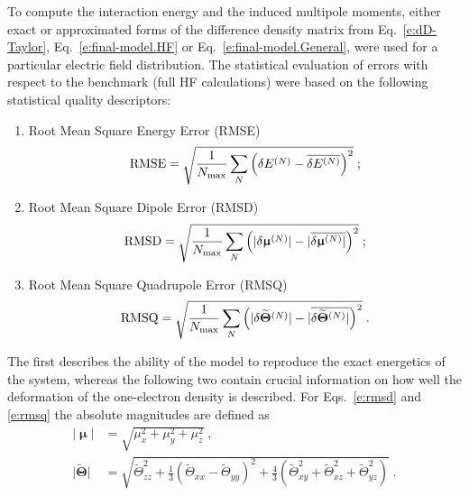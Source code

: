 \documentclass[aip,amsmath,amssymb,reprint,floatfix]{revtex4-1}
\newcommand{\BM}[1]{\bm{#1}}
\begin{document}
To compute the interaction energy and the induced multipole moments, either exact or approximated forms
of the difference density matrix from Eq.~\eqref{e:dD-Taylor}, Eq.~\eqref{e:final-model.HF} or Eq.~\eqref{e:final-model.General},
were used for a particular electric field distribution. The statistical evaluation of
errors with respect to the benchmark (full HF calculations) were based on 
the following statistical quality descriptors:
%
\begin{enumerate}
 \item Root Mean Square Energy Error (RMSE)
   \begin{equation}\label{e:rmse}
     {\rm RMSE} = \sqrt{ \frac{1}{N_{\rm max}} \sum_N \left( \delta E^{(N)} - \overline{\delta E^{(N)}}\right)^2 } \;;
   \end{equation}
 \item Root Mean Square Dipole Error (RMSD)
   \begin{equation}\label{e:rmsd}
     {\rm RMSD} = \sqrt{ \frac{1}{N_{\rm max}}\sum_N \left( \lvert \delta {\BM\upmu}^{(N)} \rvert 
                                             - \lvert \overline{\delta {\BM\upmu}^{(N)} \rvert }\right)^2 } \;;
   \end{equation}
 \item Root Mean Square Quadrupole Error (RMSQ)
   \begin{equation}\label{e:rmsq}
     {\rm RMSQ} = \sqrt{ \frac{1}{N_{\rm max}}\sum_N \left( \lvert \delta \widetilde{\BM\Theta}^{(N)} \rvert 
                                             - \lvert \overline{\delta \widetilde{\BM\Theta}^{(N)} \rvert }\right)^2 } \;.
   \end{equation}
\end{enumerate}
%
The first describes the ability of the model to reproduce the exact energetics of the system, 
whereas the following two contain crucial information on how well the deformation of the one\hyp{}electron
density is described. For Eqs.~\eqref{e:rmsd} and \eqref{e:rmsq} the absolute magnitudes
are defined as
%
\begin{subequations}\label{e:absmagn}
  \begin{align}
   \lvert {\BM\upmu} \rvert &= \sqrt{\mu_x^2+\mu_y^2+\mu_z^2} \;,\\
   \lvert {\widetilde{\BM\Theta}}\rvert &= 
          \sqrt{\widetilde{\Theta}_{zz}^2 + \frac{1}{3}\left(\widetilde{\Theta}_{xx}-\widetilde{\Theta}_{yy}\right)^2 
          + \frac{4}{3}\left( \widetilde{\Theta}_{xy}^2 + \widetilde{\Theta}_{xz}^2 + \widetilde{\Theta}_{yz}^2 \right)} \;. 
  \end{align}
\end{subequations}
\end{document}
